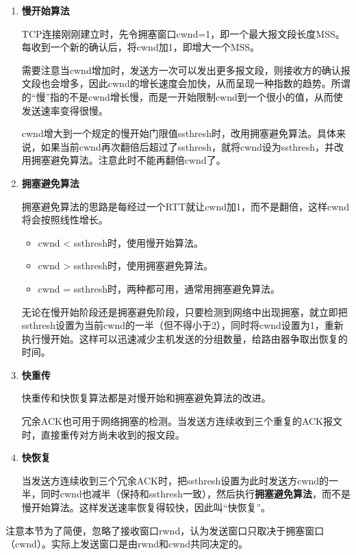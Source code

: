 \documentclass[12pt, a4paper, oneside]{ctexart}
\begin{document}
\begin{enumerate}
    \item {\bf 慢开始算法}

    TCP连接刚刚建立时，先令拥塞窗口cwnd=1，即一个最大报文段长度MSS。每收到一个新的确认后，将cwnd加1，即增大一个MSS。

    需要注意当cwnd增加时，发送方一次可以发出更多报文段，则接收方的确认报文段也会增多，因此cwnd的增长速度会加快，从而呈现一种指数的趋势。所谓的“慢”指的不是cwnd增长慢，而是一开始限制cwnd到一个很小的值，从而使发送速率变得很慢。

    cwnd增大到一个规定的慢开始门限值ssthresh时，改用拥塞避免算法。具体来说，如果当前cwnd再次翻倍后超过了ssthresh，就将cwnd设为ssthresh，并改用拥塞避免算法。注意此时不能再翻倍cwnd了。
    \item {\bf 拥塞避免算法}

    拥塞避免算法的思路是每经过一个RTT就让cwnd加1，而不是翻倍，这样cwnd将会按照线性增长。
    \begin{itemize}
        \item cwnd < ssthresh时，使用慢开始算法。
        \item cwnd > ssthresh时，使用拥塞避免算法。
        \item cwnd = ssthresh时，两种都可用，通常用拥塞避免算法。
    \end{itemize}
    无论在慢开始阶段还是拥塞避免阶段，只要检测到网络中出现拥塞，就立即把ssthresh设置为当前cwnd的一半（但不得小于2），同时将cwnd设置为1，重新执行慢开始。这样可以迅速减少主机发送的分组数量，给路由器争取出恢复的时间。
    \item {\bf 快重传}

    快重传和快恢复算法都是对慢开始和拥塞避免算法的改进。

    冗余ACK也可用于网络拥塞的检测。当发送方连续收到三个重复的ACK报文时，直接重传对方尚未收到的报文段。
    \item {\bf 快恢复}

    当发送方连续收到三个冗余ACK时，把ssthresh设置为此时发送方cwnd的一半，同时cwnd也减半（保持和ssthresh一致），然后执行\textbf{拥塞避免算法}，而不是慢开始算法。这样发送速率恢复得较快，因此叫“快恢复”。
\end{enumerate}

注意本节为了简便，忽略了接收窗口rwnd，认为发送窗口只取决于拥塞窗口（cwnd）。实际上发送窗口是由rwnd和cwnd共同决定的。


\end{document}
